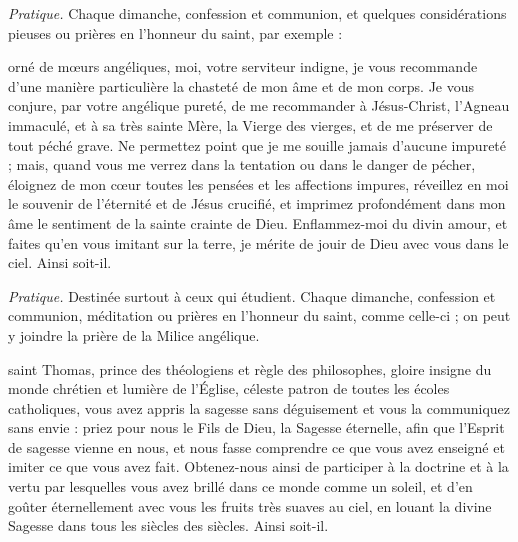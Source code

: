 \documentclass{bibliotheca-missel}
\begin{document}
\begin{notice}\textit{Pratique.} Chaque dimanche, confession et communion, et quelques considérations pieuses ou prières en l’honneur du saint, par exemple :\end{notice}
 orné de mœurs angéliques, moi, votre serviteur indigne, je vous recommande d’une manière particulière la chasteté de mon âme et de mon corps. Je vous conjure, par votre angélique pureté, de me recommander à Jésus-Christ, l’Agneau immaculé, et à sa très sainte Mère, la Vierge des vierges, et de me préserver de tout péché grave. Ne permettez point que je me souille jamais d’aucune impureté ; mais, quand vous me verrez dans la tentation ou dans le danger de pécher, éloignez de mon cœur toutes les pensées et les affections impures, réveillez en moi le souvenir de l’éternité et de Jésus crucifié, et imprimez profondément dans mon âme le sentiment de la sainte crainte de Dieu. Enflammez-moi du divin amour, et faites qu’en vous imitant sur la terre, je mérite de jouir de Dieu avec vous dans le ciel. Ainsi soit-il.

\begin{notice}\textit{Pratique.} Destinée surtout à ceux qui étudient. Chaque dimanche, confession et communion, méditation ou prières en l’honneur du saint, comme celle-ci ; on peut y joindre la prière de la Milice angélique.\end{notice}
 saint Thomas, prince des théologiens et règle des philosophes, gloire insigne du monde chrétien et lumière de l’Église, céleste patron de toutes les écoles catholiques, vous avez appris la sagesse sans déguisement et vous la communiquez sans envie : priez pour nous le Fils de Dieu, la Sagesse éternelle, afin que l’Esprit de sagesse vienne en nous, et nous fasse comprendre ce que vous avez enseigné et imiter ce que vous avez fait. Obtenez-nous ainsi de participer à la doctrine et à la vertu par lesquelles vous avez brillé dans ce monde comme un soleil, et d’en goûter éternellement avec vous les fruits très suaves au ciel, en louant la divine Sagesse dans tous les siècles des siècles. Ainsi soit-il.
\end{document}
